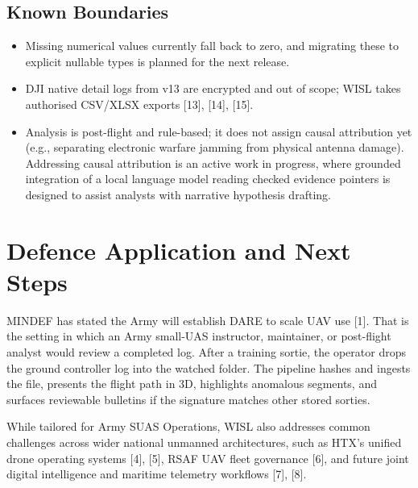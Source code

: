 \documentclass[11pt,a4paper]{article}
\begin{document}
\subsection{Known Boundaries}
\begin{itemize}
    \item Missing numerical values currently fall back to zero, and migrating these to explicit nullable types is planned for the next release.
    \item DJI native detail logs from v13 are encrypted and out of scope; WISL takes authorised CSV/XLSX exports [13], [14], [15].
    \item Analysis is post-flight and rule-based; it does not assign causal attribution yet (e.g., separating electronic warfare jamming from physical antenna damage). Addressing causal attribution is an active work in progress, where grounded integration of a local language model reading checked evidence pointers is designed to assist analysts with narrative hypothesis drafting.
\end{itemize}

\clearpage

\section{Defence Application and Next Steps}

MINDEF has stated the Army will establish DARE to scale UAV use [1]. That is the setting in which an Army small-UAS instructor, maintainer, or post-flight analyst would review a completed log. After a training sortie, the operator drops the ground controller log into the watched folder. The pipeline hashes and ingests the file, presents the flight path in 3D, highlights anomalous segments, and surfaces reviewable bulletins if the signature matches other stored sorties.

While tailored for Army SUAS Operations, WISL also addresses common challenges across wider national unmanned architectures, such as HTX's unified drone operating systems [4], [5], RSAF UAV fleet governance [6], and future joint digital intelligence and maritime telemetry workflows [7], [8].
\end{document}
